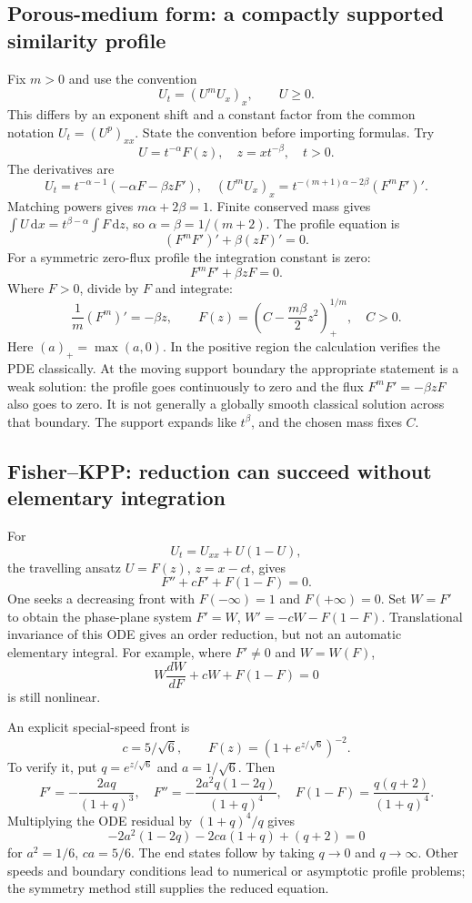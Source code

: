 \documentclass[11pt,a4paper]{article}
\numberwithin{equation}{section}
\theoremstyle{definition}
\theoremstyle{plain}
\theoremstyle{remark}
\newcommand{\dd}{\,\mathrm d}
\begin{document}
\subsection{Porous-medium form: a compactly supported similarity profile}
Fix $m>0$ and use the convention
\[
U_t=(U^mU_x)_x,\qquad U\ge0.
\]
This differs by an exponent shift and a constant factor from the common notation $U_t=(U^p)_{xx}$. State the convention before importing formulas. Try
\[
U=t^{-\alpha}F(z),\quad z=xt^{-\beta},\quad t>0.
\]
The derivatives are
\[
U_t=t^{-\alpha-1}(-\alpha F-\beta zF'),\quad
(U^mU_x)_x=t^{-(m+1)\alpha-2\beta}(F^mF')'.
\]
Matching powers gives $m\alpha+2\beta=1$. Finite conserved mass gives
$\int U\dd x=t^{\beta-\alpha}\int F\dd z$, so $\alpha=\beta=1/(m+2)$. The profile equation is
\[
(F^mF')'+\beta(zF)'=0.
\]
For a symmetric zero-flux profile the integration constant is zero:
\[
F^mF'+\beta zF=0.
\]
Where $F>0$, divide by $F$ and integrate:
\[
\frac1m(F^m)'=-\beta z,\qquad
\boxed{F(z)=\left(C-\frac{m\beta}{2}z^2\right)_+^{1/m},\quad C>0.}
\]
Here $(a)_+=\max(a,0)$. In the positive region the calculation verifies the PDE classically. At the moving support boundary the appropriate statement is a weak solution: the profile goes continuously to zero and the flux $F^mF'=-\beta zF$ also goes to zero. It is not generally a globally smooth classical solution across that boundary. The support expands like $t^\beta$, and the chosen mass fixes $C$.

\subsection{Fisher--KPP: reduction can succeed without elementary integration}
For
\[
U_t=U_{xx}+U(1-U),
\]
the travelling ansatz $U=F(z)$, $z=x-ct$, gives
\[
\boxed{F''+cF'+F(1-F)=0.}
\]
One seeks a decreasing front with $F(-\infty)=1$ and $F(+\infty)=0$. Set $W=F'$ to obtain the phase-plane system $F'=W$, $W'=-cW-F(1-F)$. Translational invariance of this ODE gives an order reduction, but not an automatic elementary integral. For example, where $F'\ne0$ and $W=W(F)$,
\[
W\frac{dW}{dF}+cW+F(1-F)=0
\]
is still nonlinear.

An explicit special-speed front is
\[
c=5/\sqrt6,\qquad F(z)=(1+e^{z/\sqrt6})^{-2}.
\]
To verify it, put $q=e^{z/\sqrt6}$ and $a=1/\sqrt6$. Then
\[
F'=-\frac{2aq}{(1+q)^3},\quad
F''=-\frac{2a^2q(1-2q)}{(1+q)^4},\quad
F(1-F)=\frac{q(q+2)}{(1+q)^4}.
\]
Multiplying the ODE residual by $(1+q)^4/q$ gives
\[
-2a^2(1-2q)-2ca(1+q)+(q+2)=0
\]
for $a^2=1/6$, $ca=5/6$. The end states follow by taking $q\to0$ and $q\to\infty$. Other speeds and boundary conditions lead to numerical or asymptotic profile problems; the symmetry method still supplies the reduced equation.
\end{document}
